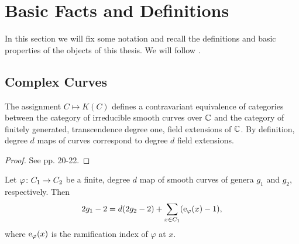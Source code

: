 \section{Basic Facts and Definitions}

In this section we will fix some notation and recall the definitions and basic properties of the objects of this thesis. We will follow 
\cite{Silverman2009}.

\iffalse
\subsection{Algebraic Curves}


\begin{defi}
 The \emph{$n$-dimensional affine space} is the set $\Abb^n$ of $n$-tuples with entries in $\Cbb$.
\end{defi}

\begin{defi}
 For an ideal $J\subset \Cbb[x_1,\ldots,x_n]$ we define the \emph{zero set $V(J)$ of $J$} as the set of points $p \in \Cbb$. For a subset 
$X\subset \Abb^n$ we define the \emph{ideal $I(V)$ of $X$} as usual.
\end{defi}
\fi

\subsection{Complex Curves}

\begin{prop} \label{prop:curves-to-fields}
 The assignment $C\mapsto K(C)$ defines a contravariant equivalence of categories between the category of irreducible smooth curves over $\Cbb$ 
and the 
category of finitely generated, transcendence degree one, field extensions of $\Cbb$. By definition, degree $d$ maps of curves correspond 
to degree $d$ field extensions.
\end{prop}

\begin{proof}
 See \cite{Silverman2009} pp. 20-22.
\end{proof}

\begin{prop} \label{prop:hurwitz}
 Let $\varphi \colon C_1 \to C_2$ be a finite, degree $d$ map of smooth curves of genera $g_1$ and $g_2$, respectively. Then \[2g_1-2 = d(2g_2-2) + 
\sum_{x\in C_1}(\operatorname{e}_{\varphi}(x)-1),\] where $\operatorname{e}_\varphi(x)$ is the ramification index of $\varphi$ at $x$.
\end{prop}

